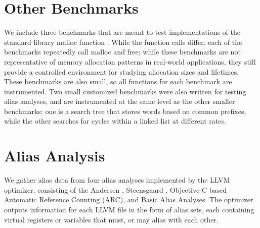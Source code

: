 \section{Other Benchmarks}
We include three benchmarks that are meant to test implementations of the standard library malloc function \cite{malloc}. While the function calls differ, each of the benchmarks repeatedly call malloc and free; while these benchmarks are not representative of memory allocation patterns in real-world applications, they still provide a controlled environment for studying allocation sizes and lifetimes. These benchmarks are also small, so all functions for each benchmark are instrumented. Two small customized benchmarks were also written for testing alias analyses, and are instrumented at the same level as the other smaller benchmarks; one is a search tree that stores words based on common prefixes, while the other searches for cycles within a linked list at different rates. 

\section{Alias Analysis}
We gather alias data from four alias analyses implemented by the LLVM optimizer, consisting of the Andersen \cite{Anders}, Steensgaard \cite{Steensgaard}, Objective-C based Automatic Reference Counting (ARC), and Basic \cite{llvmaa} Alias Analyses. The optimizer outputs information for each LLVM file in the form of alias sets, each containing virtual registers or variables that must, or may alias with each other.
